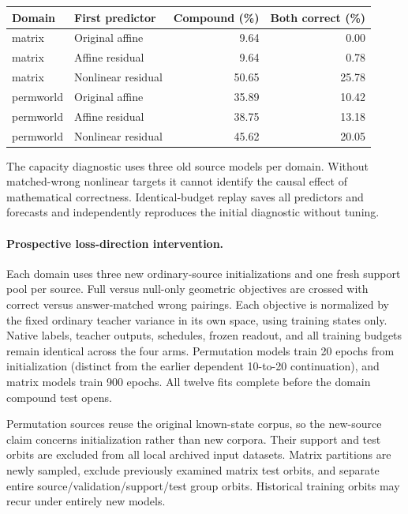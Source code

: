 \begin{center}\begin{tabular}{llrr}\toprule Domain & First predictor & Compound (\%) & Both correct (\%)\\\midrule
matrix & Original affine & 9.64 & 0.00\\
matrix & Affine residual & 9.64 & 0.78\\
matrix & Nonlinear residual & 50.65 & 25.78\\
permworld & Original affine & 35.89 & 10.42\\
permworld & Affine residual & 38.75 & 13.18\\
permworld & Nonlinear residual & 45.62 & 20.05\\
\bottomrule\end{tabular}\end{center}

The capacity diagnostic uses three old source models per domain. Without matched-wrong nonlinear targets it cannot identify the causal effect of mathematical correctness. Identical-budget replay saves all predictors and forecasts and independently reproduces the initial diagnostic without tuning.

\paragraph{Prospective loss-direction intervention.} Each domain uses three new ordinary-source initializations and one fresh support pool per source. Full versus null-only geometric objectives are crossed with correct versus answer-matched wrong pairings. Each objective is normalized by the fixed ordinary teacher variance in its own space, using training states only. Native labels, teacher outputs, schedules, frozen readout, and all training budgets remain identical across the four arms. Permutation models train 20 epochs from initialization (distinct from the earlier dependent 10-to-20 continuation), and matrix models train 900 epochs. All twelve fits complete before the domain compound test opens.

Permutation sources reuse the original known-state corpus, so the new-source claim concerns initialization rather than new corpora. Their support and test orbits are excluded from all local archived input datasets. Matrix partitions are newly sampled, exclude previously examined matrix test orbits, and separate entire source/validation/support/test group orbits. Historical training orbits may recur under entirely new models.

